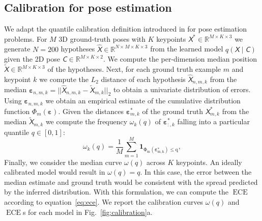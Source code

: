 \documentclass{article} \usepackage{iclr2023_conference,times}
\def\eqref#1{equation~\ref{#1}}
\def\1{\bm{1}}
\newcommand{\tens}[1]{\bm{\mathsfit{#1}}}
\def\tC{{\tens{C}}}
\def\tX{{\tens{X}}}
\newcommand{\R}{\mathbb{R}}
\begin{document}
    \subsection{Calibration for pose estimation}
    We adapt the quantile calibration definition introduced in \citet{Song2019} for pose estimation problems.
    For $M$ 3D ground-truth poses with $K$ keypoints $\tX^* \in \R^{M\times K \times 3}$ we generate $N=200$ hypotheses $\hat{\tX} \in \R^{N \times M \times K \times 3}$ from the learned model $q(\tX \mid \tC)$ given the 2D pose $\tC \in \R^{M \times K \times 2}$.
    We compute the per-dimension median position $\tilde{\tX} \in \R^{M\times K\times3}$ of the hypotheses.
    Next, for each ground truth example $m$ and keypoint $k$ we compute the $L_2$ distance of each hypothesis $\hat{\tX}_{n,m,k}$ from the median $\bm{\varepsilon}_{n,m,k} = ||\hat{\tX}_{n,m,k} - \tilde{\tX}_{m, k}||_2$ to obtain a univariate distribution of errors.
    Using $\bm{\varepsilon}_{n,m,k}$ we obtain an empirical estimate of the cumulative distribution function $\Phi_m(\bm{\varepsilon})$.
    Given the distances $\bm{\varepsilon}^*_{m, k}$ of the ground truth $\tX^*_{m,k}$ from the median $\tilde{\tX}_{m, k}$ we compute the frequency $\omega_{k}(q)$ of $\bm{\varepsilon}^*_{:, k}$ falling into a particular quantile $q \in [0, 1]$:
    \begin{equation*}
        \omega_k(q) = \frac{1}{M} \sum^M_{m = 1} \1_\mathrm{\Phi_m(\bm{\varepsilon}^*_{m, k}) \le q},
    \end{equation*}
    Finally, we consider the median curve $\omega(q)$ across $K$ keypoints.
    An ideally calibrated model would result in $\omega(q) = q$.
    In this case, the error between the median estimate and ground truth would be consistent with the spread predicted by the inferred distribution.  
    With this formulation, we can compute the $\operatorname{ECE}$ according to \eqref{eq:ece}.
    We report the calibration curves $\omega(q)$ and $\operatorname{ECE}$s for each model in Fig.~\ref{fig:calibration}a.
\end{document}
